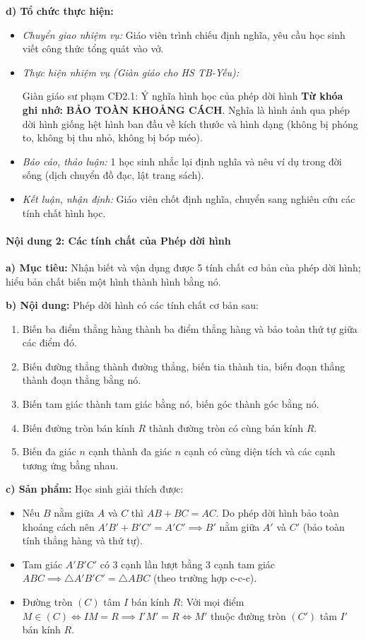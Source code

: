 \documentclass[12pt, a4paper]{article}
\begin{document}
\textbf{d) Tổ chức thực hiện:}
\begin{itemize}[leftmargin=0.6cm]
    \item \textit{Chuyển giao nhiệm vụ:} Giáo viên trình chiếu định nghĩa, yêu cầu học sinh viết công thức tổng quát vào vở.
    \item \textit{Thực hiện nhiệm vụ (Giàn giáo cho HS TB-Yếu):}
    \begin{scaffoldbox}{Giàn giáo sư phạm CĐ2.1: Ý nghĩa hình học của phép dời hình}
        \textbf{Từ khóa ghi nhớ:} \textbf{BẢO TOÀN KHOẢNG CÁCH}.
        Nghĩa là hình ảnh qua phép dời hình giống hệt hình ban đầu về kích thước và hình dạng (không bị phóng to, không bị thu nhỏ, không bị bóp méo).
    \end{scaffoldbox}
    \item \textit{Báo cáo, thảo luận:} 1 học sinh nhắc lại định nghĩa và nêu ví dụ trong đời sống (dịch chuyển đồ đạc, lật trang sách).
    \item \textit{Kết luận, nhận định:} Giáo viên chốt định nghĩa, chuyển sang nghiên cứu các tính chất hình học.
\end{itemize}

\paragraph{Nội dung 2: Các tính chất của Phép dời hình}
\textbf{a) Mục tiêu:} Nhận biết và vận dụng được 5 tính chất cơ bản của phép dời hình; hiểu bản chất biến một hình thành hình bằng nó.

\textbf{b) Nội dung:}
Phép dời hình có các tính chất cơ bản sau:
\begin{enumerate}[leftmargin=0.8cm]
    \item Biến ba điểm thẳng hàng thành ba điểm thẳng hàng và bảo toàn thứ tự giữa các điểm đó.
    \item Biến đường thẳng thành đường thẳng, biến tia thành tia, biến đoạn thẳng thành đoạn thẳng bằng nó.
    \item Biến tam giác thành tam giác bằng nó, biến góc thành góc bằng nó.
    \item Biến đường tròn bán kính $R$ thành đường tròn có cùng bán kính $R$.
    \item Biến đa giác $n$ cạnh thành đa giác $n$ cạnh có cùng diện tích và các cạnh tương ứng bằng nhau.
\end{enumerate}

\textbf{c) Sản phẩm:} Học sinh giải thích được:
\begin{itemize}[leftmargin=0.6cm]
    \item Nếu $B$ nằm giữa $A$ và $C$ thì $AB + BC = AC$. Do phép dời hình bảo toàn khoảng cách nên $A'B' + B'C' = A'C' \implies B'$ nằm giữa $A'$ và $C'$ (bảo toàn tính thẳng hàng và thứ tự).
    \item Tam giác $A'B'C'$ có 3 cạnh lần lượt bằng 3 cạnh tam giác $ABC \implies \triangle A'B'C' = \triangle ABC$ (theo trường hợp c-c-c).
    \item Đường tròn $(C)$ tâm $I$ bán kính $R$: Với mọi điểm $M \in (C) \iff IM = R \implies I'M' = R \iff M'$ thuộc đường tròn $(C')$ tâm $I'$ bán kính $R$.
\end{itemize}
\end{document}
